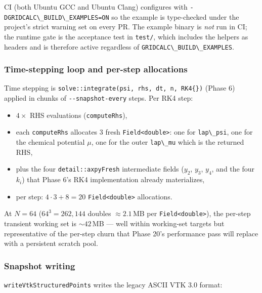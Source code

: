 CI (both Ubuntu GCC and Ubuntu Clang) configures with
\passthrough{\lstinline!-DGRIDCALC\_BUILD\_EXAMPLES=ON!} so the
example is type-checked under the project's strict warning set on
every PR. The example binary is \emph{not} run in CI; the runtime
gate is the acceptance test in \passthrough{\lstinline!test/!}, which
includes the helpers as headers and is therefore active regardless
of \passthrough{\lstinline!GRIDCALC\_BUILD\_EXAMPLES!}.

\subsubsection{Time-stepping loop and per-step
allocations}\label{phase12-loop}

Time stepping is \passthrough{\lstinline!solve::integrate(psi, rhs,
dt, n, RK4{})!} (Phase 6) applied in chunks of
\passthrough{\lstinline!--snapshot-every!} steps. Per RK4 step:
\begin{itemize}
\tightlist
\item \(4\times\) RHS evaluations
   (\passthrough{\lstinline!computeRhs!}),
\item each \passthrough{\lstinline!computeRhs!} allocates 3 fresh
   \passthrough{\lstinline!Field<double>!}: one for
   \passthrough{\lstinline!lap\_psi!}, one for the chemical potential
   \(\mu\), one for the outer \passthrough{\lstinline!lap\_mu!} which
   is the returned RHS,
\item plus the four
   \passthrough{\lstinline!detail::axpyFresh!}
   intermediate fields (\(y_2\), \(y_3\), \(y_4\), and the four
   \(k_i\)) that Phase 6's RK4 implementation already materializes,
\item per step: \(4 \cdot 3 + 8 = 20\)
   \passthrough{\lstinline!Field<double>!} allocations.
\end{itemize}

At \(N=64\) (\(64^3 = 262{,}144\) doubles \(\approx 2.1\,\)MB per
\passthrough{\lstinline!Field<double>!}), the per-step transient
working set is \(\sim 42\,\)MB --- well within working-set targets but
representative of the per-step churn that Phase 20's performance pass
will replace with a persistent scratch pool.

\subsubsection{Snapshot writing}\label{phase12-snapshot}

\passthrough{\lstinline!writeVtkStructuredPoints!} writes the legacy
ASCII VTK 3.0 format:

